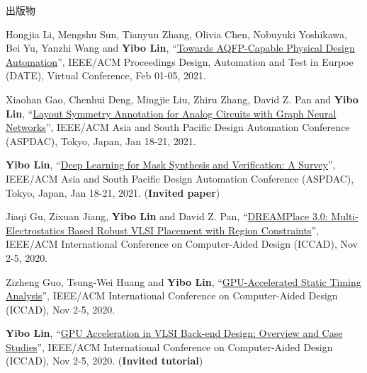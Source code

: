 \begin{rSection}{出版物}
\begin{description}[font=\normalfont]
{}
            

\item[{[C45]}]{
        Hongjia Li, Mengshu Sun, Tianyun Zhang, Olivia Chen, Nobuyuki Yoshikawa, Bei Yu, Yanzhi Wang and \textbf{Yibo Lin}, 
    ``\href{https://doi.org/10.23919/DATE51398.2021.9474259}{Towards AQFP-Capable Physical Design Automation}'', 
    IEEE/ACM Proceedings Design, Automation and Test in Eurpoe (DATE), Virtual Conference, Feb 01-05, 2021.
    
}
            

\item[{[C44]}]{
        Xiaohan Gao, Chenhui Deng, Mingjie Liu, Zhiru Zhang, David Z. Pan and \textbf{Yibo Lin}, 
    ``\href{https://doi.org/10.1145/3394885.3431545}{Layout Symmetry Annotation for Analog Circuits with Graph Neural Networks}'', 
    IEEE/ACM Asia and South Pacific Design Automation Conference (ASPDAC), Tokyo, Japan, Jan 18-21, 2021.
    
}
            

\item[{[C43]}]{
        \textbf{Yibo Lin}, 
    ``\href{https://doi.org/10.1145/3394885.3431624}{Deep Learning for Mask Synthesis and Verification: A Survey}'', 
    IEEE/ACM Asia and South Pacific Design Automation Conference (ASPDAC), Tokyo, Japan, Jan 18-21, 2021.
    (\textbf{Invited paper})
}
            

\item[{[C42]}]{
        Jiaqi Gu, Zixuan Jiang, \textbf{Yibo Lin} and David Z. Pan, 
    ``\href{https://doi.org/10.1145/3400302.3415691}{DREAMPlace 3.0: Multi-Electrostatics Based Robust VLSI Placement with Region Constraints}'', 
    IEEE/ACM International Conference on Computer-Aided Design (ICCAD), Nov 2-5, 2020.
    
}
            

\item[{[C41]}]{
        Zizheng Guo, Tsung-Wei Huang and \textbf{Yibo Lin}, 
    ``\href{https://doi.org/10.1145/3400302.3415631}{GPU-Accelerated Static Timing Analysis}'', 
    IEEE/ACM International Conference on Computer-Aided Design (ICCAD), Nov 2-5, 2020.
    
}
            

\item[{[C40]}]{
        \textbf{Yibo Lin}, 
    ``\href{https://doi.org/10.1145/3400302.3415765}{GPU Acceleration in VLSI Back-end Design: Overview and Case Studies}'', 
    IEEE/ACM International Conference on Computer-Aided Design (ICCAD), Nov 2-5, 2020.
    (\textbf{Invited tutorial})
}
            


\end{description}
\end{rSection}
